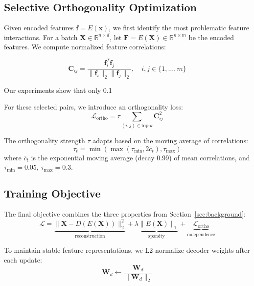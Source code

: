\documentclass{article} %
\begin{document}
\subsection{Selective Orthogonality Optimization}
Given encoded features $\mathbf{f} = E(\mathbf{x})$, we first identify the most problematic feature interactions. For a batch $\mathbf{X} \in \mathbb{R}^{n \times d}$, let $\mathbf{F} = E(\mathbf{X}) \in \mathbb{R}^{n \times m}$ be the encoded features. We compute normalized feature correlations:

\begin{equation}
    \mathbf{C}_{ij} = \frac{\mathbf{f}_i^T\mathbf{f}_j}{\|\mathbf{f}_i\|_2\|\mathbf{f}_j\|_2}, \quad i,j \in \{1,\ldots,m\}
\end{equation}

Our experiments show that only 0.1%

For these selected pairs, we introduce an orthogonality loss:
\begin{equation}
    \mathcal{L}_{\text{ortho}} = \tau \sum_{(i,j) \in \text{top-}k} \mathbf{C}_{ij}^2
\end{equation}

The orthogonality strength $\tau$ adapts based on the moving average of correlations:
\begin{equation}
    \tau_t = \min(\max(\tau_{\text{min}}, 2\bar{c}_t), \tau_{\text{max}})
\end{equation}
where $\bar{c}_t$ is the exponential moving average (decay 0.99) of mean correlations, and $\tau_{\text{min}}=0.05$, $\tau_{\text{max}}=0.3$.

\subsection{Training Objective}
The final objective combines the three properties from Section~\ref{sec:background}:
\begin{equation}
    \mathcal{L} = \underbrace{\|\mathbf{X} - D(E(\mathbf{X}))\|_2^2}_{\text{reconstruction}} + \underbrace{\lambda\|E(\mathbf{X})\|_1}_{\text{sparsity}} + \underbrace{\mathcal{L}_{\text{ortho}}}_{\text{independence}}
\end{equation}

To maintain stable feature representations, we L2-normalize decoder weights after each update:
\begin{equation}
    \mathbf{W}_d \leftarrow \frac{\mathbf{W}_d}{\|\mathbf{W}_d\|_2}
\end{equation}
\end{document}
